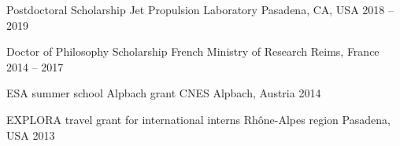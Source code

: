 

\begin{cvhonors}

  \cvhonor
  	{Postdoctoral Scholarship}
  	{Jet Propulsion Laboratory}
  	{Pasadena, CA, USA}
  	{2018 -- 2019}

  \cvhonor
  	{Doctor of Philosophy Scholarship}
  	{French Ministry of Research}
  	{Reims, France}
  	{2014 -- 2017}

  \cvhonor
  	{ESA summer school Alpbach grant}
  	{CNES}
  	{Alpbach, Austria}
  	{2014}

  \cvhonor
  	{EXPLORA travel grant for international interns}
  	{Rhône-Alpes region}
  	{Pasadena, USA}
  	{2013}

\end{cvhonors}
